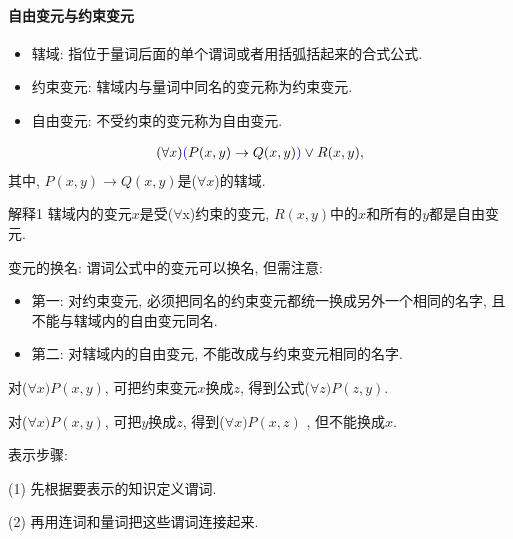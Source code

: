 \paragraph{自由变元与约束变元}
\begin{itemize}
\item 辖域: 指位于量词后面的单个谓词或者用括弧括起来的合式公式.
\item 约束变元: 辖域内与量词中同名的变元称为约束变元.
\item 自由变元: 不受约束的变元称为自由变元.
\end{itemize}
\begin{example}
\begin{align}
  (\forall x)\textcolor[rgb]{0,0,1}{(}P(x,y)\rightarrow Q(x,y)\textcolor[rgb]{0,0,1}{)}\vee R(x, y),
\end{align}
其中, $P(x,y)\rightarrow Q(x,y)$是($\forall x$)的辖域.
\end{example}
\begin{myprop}{解释}{1}
辖域内的变元$x$是受($\forall$x)约束的变元, $R(x, y)$中的$x$和所有的$y$都是自由变元.
\end{myprop}

变元的换名: 谓词公式中的变元可以换名, 但需注意:
\begin{itemize}
\item 第一: 对约束变元, 必须把同名的约束变元都统一换成另外一个相同的名字, 且不能与辖域内的自由变元同名.
\item 第二: 对辖域内的自由变元, 不能改成与约束变元相同的名字.
\end{itemize}
\begin{example}
对($\forall x)P(x,y)$, 可把约束变元$x$换成$z$, 得到公式($\forall z)P(z, y)$.
\end{example}
\begin{example}
对($\forall x)P(x,y)$, 可把$y$换成$z$, 得到($\forall x)P(x,z)$ , 但不能换成$x$.
\end{example}

表示步骤:

(1) 先根据要表示的知识定义谓词.

(2) 再用连词和量词把这些谓词连接起来.

